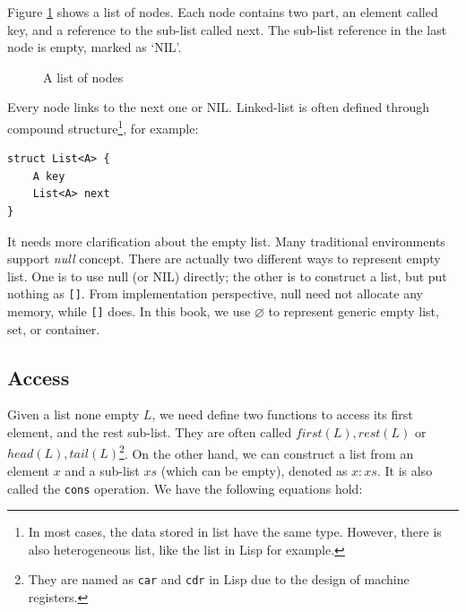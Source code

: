 \documentclass[b5paper]{article}
\begin{document}
Figure \ref{fig:list-example} shows a list of nodes. Each node contains two part, an element called key, and a reference to the sub-list called next. The sub-list reference in the last node is empty, marked as `NIL'.

\begin{figure}[htbp]
  \centering
  \caption{A list of nodes}
  \label{fig:list-example}
\end{figure}

Every node links to the next one or NIL. Linked-list is often defined through compound structure\footnote{In most cases, the data stored in list have the same type. However, there is also heterogeneous list, like the list in Lisp for example.}, for example:

\lstset{frame=single}
\begin{lstlisting}[language=Bourbaki]
struct List<A> {
    A key
    List<A> next
}
\end{lstlisting}

 
It needs more clarification about the empty list. Many traditional environments support {\em null} concept. There are actually two different ways to represent empty list. One is to use null (or NIL) directly; the other is to construct a list, but put nothing as \texttt{[]}. From implementation perspective, null need not allocate any memory, while \texttt{[]} does. In this book, we use $\varnothing$ to represent generic empty list, set, or container.

\subsection{Access}
 
 
Given a list none empty $L$, we need define two functions to access its first element, and the rest sub-list. They are often called $first(L), rest(L)$ or $head(L), tail(L)$\footnote{They are named as \texttt{car} and \texttt{cdr} in Lisp due to the design of machine registers\cite{SICP}.}. On the other hand, we can construct a list from an element $x$ and a sub-list $xs$ (which can be empty), denoted as $x : xs$. It is also called the \texttt{cons} operation. We have the following equations hold:
\end{document}
